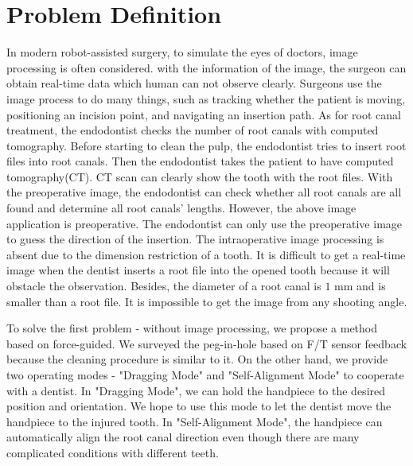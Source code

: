 \section{Problem Definition}
\label{sec:pro def}
In modern robot-assisted surgery, to simulate the eyes of doctors,  image processing is often considered. with the information of the image, the surgeon can obtain real-time data which human can not observe clearly. Surgeons use the image process to do many things, such as tracking whether the patient is moving, positioning an incision point, and navigating an insertion path. As for root canal treatment, the endodontist checks the number of root canals with computed tomography.  Before starting to clean the pulp, the endodontist tries to insert root files into root canals. Then the endodontist takes the patient to have computed tomography(CT). CT scan can clearly show the tooth with the root files. With the preoperative image, the endodontist can check whether all root canals are all found and determine all root canals' lengths. However, the above image application is preoperative. The endodontist can only use the preoperative image to guess the direction of the insertion. The intraoperative image processing is absent due to the dimension restriction of a tooth. It is difficult to get a real-time image when the dentist inserts a root file into the opened tooth because it will obstacle the observation. Besides, the diameter of a root canal is $1$ mm and is smaller than a root file. It is impossible to get the image from any shooting angle.
\par
To solve the first problem - without image processing, we propose a method based on force-guided. We surveyed the peg-in-hole based on F/T sensor feedback \cite{7743375} because the cleaning procedure is similar to it. On the other hand, we provide two operating modes - "Dragging Mode" and "Self-Alignment Mode" to cooperate with a dentist. In "Dragging Mode", we can hold the handpiece to the desired position and orientation. We hope to use this mode to let the dentist move the handpiece to the injured tooth. In "Self-Alignment Mode", the handpiece can automatically align the root canal direction even though there are many complicated conditions with different teeth.


